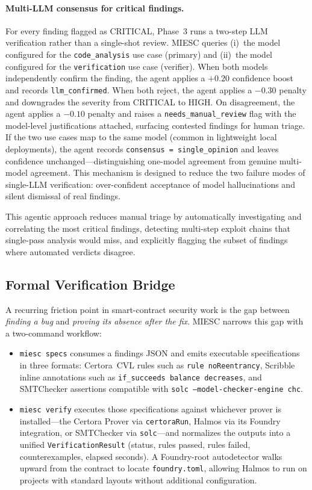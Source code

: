 \documentclass[conference]{IEEEtran}
\begin{document}
\paragraph{Multi-LLM consensus for critical findings.}
For every finding flagged as CRITICAL, Phase~3 runs a two-step LLM verification rather than a single-shot review. MIESC queries (i)~the model configured for the \texttt{code\_analysis} use case (primary) and (ii)~the model configured for the \texttt{verification} use case (verifier). When both models independently confirm the finding, the agent applies a $+0.20$ confidence boost and records \texttt{llm\_confirmed}. When both reject, the agent applies a $-0.30$ penalty and downgrades the severity from CRITICAL to HIGH. On disagreement, the agent applies a $-0.10$ penalty and raises a \texttt{needs\_manual\_review} flag with the model-level justifications attached, surfacing contested findings for human triage. If the two use cases map to the same model (common in lightweight local deployments), the agent records \texttt{consensus = single\_opinion} and leaves confidence unchanged---distinguishing one-model agreement from genuine multi-model agreement. This mechanism is designed to reduce the two failure modes of single-LLM verification: over-confident acceptance of model hallucinations and silent dismissal of real findings.

This agentic approach reduces manual triage by automatically investigating and correlating the most critical findings, detecting multi-step exploit chains that single-pass analysis would miss, and explicitly flagging the subset of findings where automated verdicts disagree.

\subsection{Formal Verification Bridge}
\label{sec:formalbridge}

A recurring friction point in smart-contract security work is the gap between \emph{finding a bug} and \emph{proving its absence after the fix}. MIESC narrows this gap with a two-command workflow:

\begin{itemize}
    \item \texttt{miesc specs} consumes a findings JSON and emits executable specifications in three formats: Certora~CVL rules such as \texttt{rule noReentrancy}, Scribble inline annotations such as \texttt{if\_succeeds balance decreases}, and SMTChecker assertions compatible with \texttt{solc --model-checker-engine chc}.
    \item \texttt{miesc verify} executes those specifications against whichever prover is installed---the Certora Prover via \texttt{certoraRun}, Halmos via its Foundry integration, or SMTChecker via \texttt{solc}---and normalizes the outputs into a unified \texttt{VerificationResult} (status, rules passed, rules failed, counterexamples, elapsed seconds). A Foundry-root autodetector walks upward from the contract to locate \texttt{foundry.toml}, allowing Halmos to run on projects with standard layouts without additional configuration.
\end{itemize}
\end{document}
